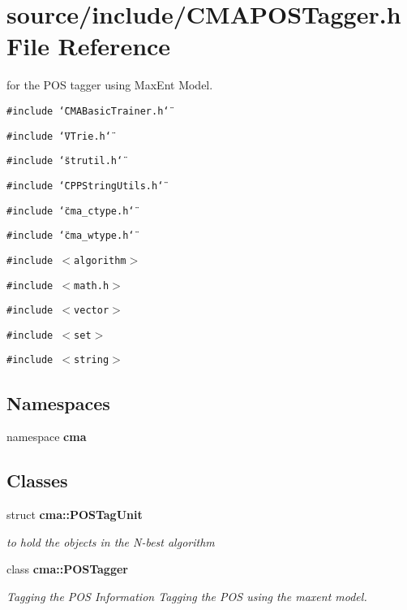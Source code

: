 \section{source/include/CMAPOSTagger.h File Reference}
\label{CMAPOSTagger_8h}
for the POS tagger using MaxEnt Model. 

{\tt \#include \char`\"{}CMABasicTrainer.h\char`\"{}}\par
{\tt \#include \char`\"{}VTrie.h\char`\"{}}\par
{\tt \#include \char`\"{}strutil.h\char`\"{}}\par
{\tt \#include \char`\"{}CPPStringUtils.h\char`\"{}}\par
{\tt \#include \char`\"{}cma\_\-ctype.h\char`\"{}}\par
{\tt \#include \char`\"{}cma\_\-wtype.h\char`\"{}}\par
{\tt \#include $<$algorithm$>$}\par
{\tt \#include $<$math.h$>$}\par
{\tt \#include $<$vector$>$}\par
{\tt \#include $<$set$>$}\par
{\tt \#include $<$string$>$}\par
\subsection*{Namespaces}
\begin{CompactItemize}
\item 
namespace \textbf{cma}
\end{CompactItemize}
\subsection*{Classes}
\begin{CompactItemize}
\item 
struct {\bf cma::POSTagUnit}
\begin{CompactList}\small\item\em to hold the objects in the N-best algorithm \item\end{CompactList}\item 
class {\bf cma::POSTagger}
\begin{CompactList}\small\item\em Tagging the POS Information Tagging the POS using the maxent model. \item\end{CompactList}\end{CompactItemize}
